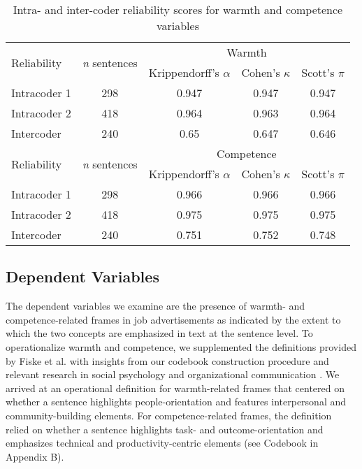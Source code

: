 \documentclass[jou]{apa7}
\begin{document}
\begin{table*}
    \centering
    \vspace*{2em}
    \begin{threeparttable}
        \caption{Intra- and inter-coder reliability scores for warmth and competence variables}
        \label{table2}
        \begin{tabular}[]{@{}lcccc@{}}
            \toprule
            \multirow{2}{*}{Reliability} & \multirow{2}{*}{\textit{n} sentences} & \multicolumn{3}{c}{Warmth}\\
            \cmidrule(l){3-5}
            & & Krippendorff’s $\alpha$ & Cohen’s $\kappa$ & Scott’s $\pi$\\
            \midrule
            Intracoder 1 & 298 & 0.947 & 0.947 & 0.947\\
            Intracoder 2 & 418 & 0.964 & 0.963 & 0.964\\
            Intercoder   & 240 & 0.65  & 0.647 & 0.646\\
            \midrule[.75pt]
            \multirow{2}{*}{Reliability} & \multirow{2}{*}{\textit{n} sentences} & \multicolumn{3}{c}{Competence}\\
            \cmidrule(l){3-5}
            & & Krippendorff’s $\alpha$ & Cohen’s $\kappa$ & Scott’s $\pi$\\
            \midrule
            Intracoder 1 & 298 & 0.966 & 0.966 & 0.966\\
            Intracoder 2 & 418 & 0.975 & 0.975 & 0.975\\
            Intercoder   & 240 & 0.751 & 0.752 & 0.748\\
            \bottomrule
            \end{tabular}
        \end{threeparttable}
    \end{table*}

\subsection{Dependent Variables}
\label{dependent_variables}
The dependent variables we examine are the presence of warmth- and competence-related frames in job advertisements as indicated by the extent to which the two concepts are emphasized in text at the sentence level. To operationalize warmth and competence, we supplemented the definitions provided by Fiske et al. \parencite{fiskeModelOftenMixed2002} with insights from our codebook construction procedure and relevant research in social psychology and organizational communication \parencite[e.g.,][]{bruckmullerDensityBigTwo2013,Gaucher2011,kringsStereotypicalInferencesMediators2011,kroonReliableUnproductiveStereotypes2018,vanselmSearchOlderWorker2021}. We arrived at an operational definition for warmth-related frames that centered on whether a sentence highlights people-orientation and features interpersonal and community-building elements. For competence-related frames, the definition relied on whether a sentence highlights task- and outcome-orientation and emphasizes technical and productivity-centric elements (see Codebook in Appendix B).
\end{document}
